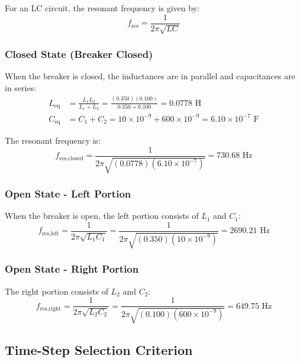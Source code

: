 For an LC circuit, the resonant frequency is given by:
\begin{equation}
    f_{\text{res}} = \frac{1}{2\pi\sqrt{LC}}
\end{equation}

\subsubsection{Closed State (Breaker Closed)}

When the breaker is closed, the inductances are in parallel and capacitances are in series:
\begin{align}
    L_{\text{eq}} &= \frac{L_1 L_2}{L_1 + L_2} = \frac{(0.350)(0.100)}{0.350 + 0.100} = 0.0778\text{ H} \\
    C_{\text{eq}} &= C_1 + C_2 = 10\times 10^{-9} + 600\times 10^{-9} = 6.10\times 10^{-7}\text{ F}
\end{align}

The resonant frequency is:
\begin{equation}
    f_{\text{res,closed}} = \frac{1}{2\pi\sqrt{(0.0778)(6.10\times 10^{-7})}} = 730.68\text{ Hz}
\end{equation}

\subsubsection{Open State - Left Portion}

When the breaker is open, the left portion consists of $L_1$ and $C_1$:
\begin{equation}
    f_{\text{res,left}} = \frac{1}{2\pi\sqrt{L_1 C_1}} = \frac{1}{2\pi\sqrt{(0.350)(10\times 10^{-9})}} = 2690.21\text{ Hz}
\end{equation}

\subsubsection{Open State - Right Portion}

The right portion consists of $L_2$ and $C_2$:
\begin{equation}
    f_{\text{res,right}} = \frac{1}{2\pi\sqrt{L_2 C_2}} = \frac{1}{2\pi\sqrt{(0.100)(600\times 10^{-9})}} = 649.75\text{ Hz}
\end{equation}

\subsection{Time-Step Selection Criterion}

